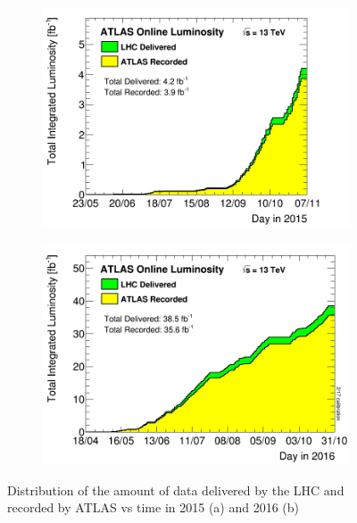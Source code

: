 \begin{figure}[h!]
  \begin{center}
    \begin{subfigure}[b]{0.40\textwidth}
        \includegraphics[width=\textwidth]{figures/Data/IntLumi2015.png}
                \caption{ }
    \end{subfigure}
    \begin{subfigure}[b]{0.40\textwidth}
        \includegraphics[width=\textwidth]{figures/Data/IntLumi2016.png}
                \caption{ }
    \end{subfigure}
\end{center}
\caption{Distribution of the amount of data delivered by the LHC and recorded by ATLAS vs time in 2015 (a) and 2016 (b) }
\label{fig:data2015-2016} 
\end{figure}

